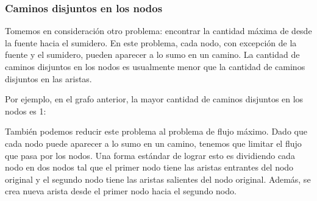 \subsubsection{Caminos disjuntos en los nodos}

Tomemos en consideraci\'on otro problema:
encontrar la cantidad m\'axima de
 desde la fuente
hacia el sumidero.
En este problema, cada nodo,
con excepci\'on de la fuente y el sumidero,
pueden aparecer a lo sumo en un camino.
La cantidad de caminos disjuntos en los nodos es
usualmente menor que la cantidad de
caminos disjuntos en las aristas.

Por ejemplo, en el grafo anterior,
la mayor cantidad de caminos disjuntos en los nodos es 1:

\begin{center}
\end{center}

Tambi\'en podemos reducir este problema al problema de flujo m\'aximo.
Dado que cada nodo puede aparecer a lo sumo en un camino,
tenemos que limitar el flujo que pasa por los nodos.
Una forma est\'andar de lograr esto es dividiendo cada nodo en dos nodos
tal que el primer nodo tiene las aristas entrantes
del nodo original y el segundo nodo tiene las aristas salientes
del nodo original.
Adem\'as, se crea nueva arista desde el primer nodo
hacia el segundo nodo.

